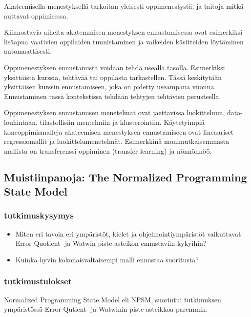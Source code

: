\documentclass[finnish,twoside,openright]{HYgraduMLDS}
\begin{document}
Akateemisella menestyksellä tarkoitan yleisesti oppimenestystä, ja taitoja mitkä auttavat oppimisessa.

Kiinnostavia aiheita akatemmisen menestyksen ennustamisessa ovat esimerkiksi lisäapua vaativien oppilaiden tunnistaminen ja vaikeiden käsitteiden löytäminen automaattisesti.

Oppimenestyksen ennustamista voidaan tehdä usealla tasolla. Esimerkiksi yksittäistä kurssia, tehtävää tai oppilasta tarkastellen\cite{hellas2018predicting}. Tässä keskitytään yksittäisen kurssin ennustamiseen, joka on pidetty useampana vuonna. Ennustaminen tässä kontekstissa tehdään tehtyjen tehtävien perusteella.

Oppimenestyksen ennustamisen menetelmät ovat jaettavissa luokitteluun, data-louhintaan, tilastollisiin mentelmiin ja klusterointiin\cite{hellas2018predicting}. Käytetyimpiä koneoppimismalleja akateemisen menestyksen ennustamiseen ovat lineaariset regressiomallit ja luokittelumenetelmät. Esimerkkinä monimutkaisemmasta mallista on transferenssi-oppiminen (transfer learning)\cite{lagus2018transfer} ja nönnönnöö.

\subsection{Muistiinpanoja: The Normalized Programming State Model}

\subsubsection{tutkimuskysymys}

\begin{itemize}
    \item Miten eri tavoin eri ympäristöt, kielet ja ohjelmointiympäristöt vaikuttavat Error Quotient\cite{jadud2006methods}- ja Watwin\cite{watson2014no} piste-asteikon ennustaviin kykyihin?
    \item Kuinka hyvin kokonaisvaltaisempi malli ennustaa suoritusta?
\end{itemize}


\subsubsection{tutkimustulokset}

Normalized Programming State Model eli NPSM, suoriutui tutkimuksen\cite{carter2015normalized} ympäristössä Error Qutient- ja Watwinin piste-asteikkoa paremmin.
\end{document}

